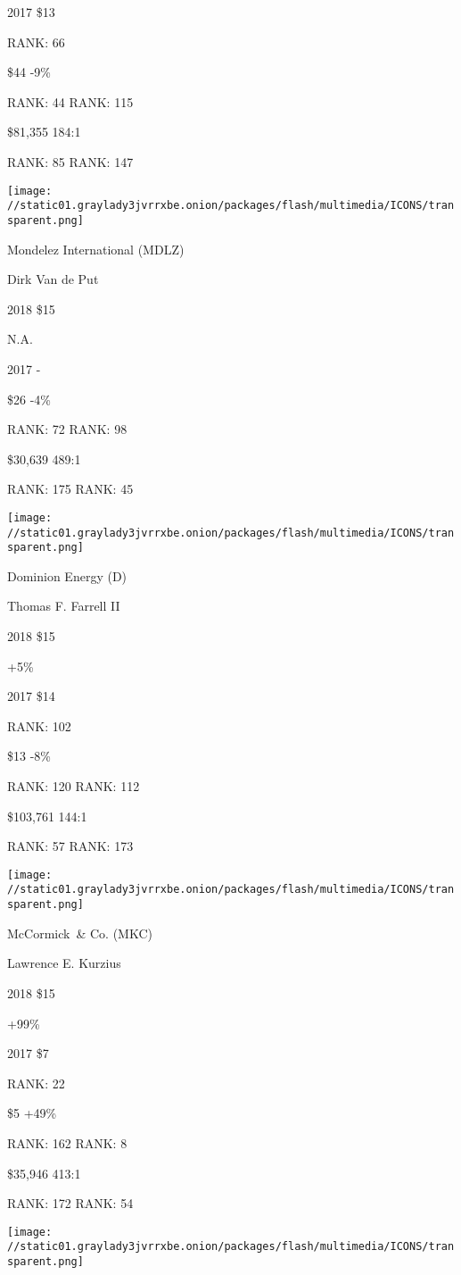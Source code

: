 2017 \$13

RANK: 66

 \$44 -9\%

RANK: 44 RANK: 115

 \$81,355 184:1

RANK: 85 RANK: 147

\texttt{[image: //static01.graylady3jvrrxbe.onion/packages/flash/multimedia/ICONS/transparent.png]}

Mondelez International (MDLZ)

Dirk Van de Put \protect\hyperlink{g-footnotes}{}

2018 \$15

 N.A.

2017 -

 \$26 -4\%

RANK: 72 RANK: 98

 \$30,639 489:1

RANK: 175 RANK: 45

\texttt{[image: //static01.graylady3jvrrxbe.onion/packages/flash/multimedia/ICONS/transparent.png]}

Dominion Energy (D)

Thomas F. Farrell II \protect\hyperlink{g-footnotes}{}

2018 \$15

 +5\%

2017 \$14

RANK: 102

 \$13 -8\%

RANK: 120 RANK: 112

 \$103,761 144:1

RANK: 57 RANK: 173

\texttt{[image: //static01.graylady3jvrrxbe.onion/packages/flash/multimedia/ICONS/transparent.png]}

McCormick~\& Co. (MKC)

Lawrence E. Kurzius \protect\hyperlink{g-footnotes}{}

2018 \$15

 +99\%

2017 \$7

RANK: 22

 \$5 +49\%

RANK: 162 RANK: 8

 \$35,946 413:1

RANK: 172 RANK: 54

\texttt{[image: //static01.graylady3jvrrxbe.onion/packages/flash/multimedia/ICONS/transparent.png]}

